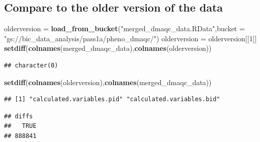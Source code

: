\documentclass[]{article}
\newenvironment{Shaded}{\begin{snugshade}}{\end{snugshade}}
\newcommand{\KeywordTok}[1]{\textcolor[rgb]{0.13,0.29,0.53}{\textbf{#1}}}
\newcommand{\DataTypeTok}[1]{\textcolor[rgb]{0.13,0.29,0.53}{#1}}
\newcommand{\DecValTok}[1]{\textcolor[rgb]{0.00,0.00,0.81}{#1}}
\newcommand{\StringTok}[1]{\textcolor[rgb]{0.31,0.60,0.02}{#1}}
\newcommand{\OperatorTok}[1]{\textcolor[rgb]{0.81,0.36,0.00}{\textbf{#1}}}
\newcommand{\NormalTok}[1]{#1}
\begin{document}
\subsection{Compare to the older version of the
data}\label{compare-to-the-older-version-of-the-data}

\begin{Shaded}
\begin{Highlighting}[]
\NormalTok{olderversion =}\StringTok{ }\KeywordTok{load_from_bucket}\NormalTok{(}\StringTok{"merged_dmaqc_data.RData"}\NormalTok{,}\DataTypeTok{bucket =} \StringTok{"gs://bic_data_analysis/pass1a/pheno_dmaqc/"}\NormalTok{)}
\NormalTok{olderversion =}\StringTok{ }\NormalTok{olderversion[[}\DecValTok{1}\NormalTok{]]}
\KeywordTok{setdiff}\NormalTok{(}\KeywordTok{colnames}\NormalTok{(merged_dmaqc_data),}\KeywordTok{colnames}\NormalTok{(olderversion))}
\end{Highlighting}
\end{Shaded}

\begin{verbatim}
## character(0)
\end{verbatim}

\begin{Shaded}
\begin{Highlighting}[]
\KeywordTok{setdiff}\NormalTok{(}\KeywordTok{colnames}\NormalTok{(olderversion),}\KeywordTok{colnames}\NormalTok{(merged_dmaqc_data))}
\end{Highlighting}
\end{Shaded}

\begin{verbatim}
## [1] "calculated.variables.pid" "calculated.variables.bid"
\end{verbatim}

\begin{Shaded}
\end{Shaded}

\begin{verbatim}
## diffs
##   TRUE 
## 888841
\end{verbatim}
\end{document}
